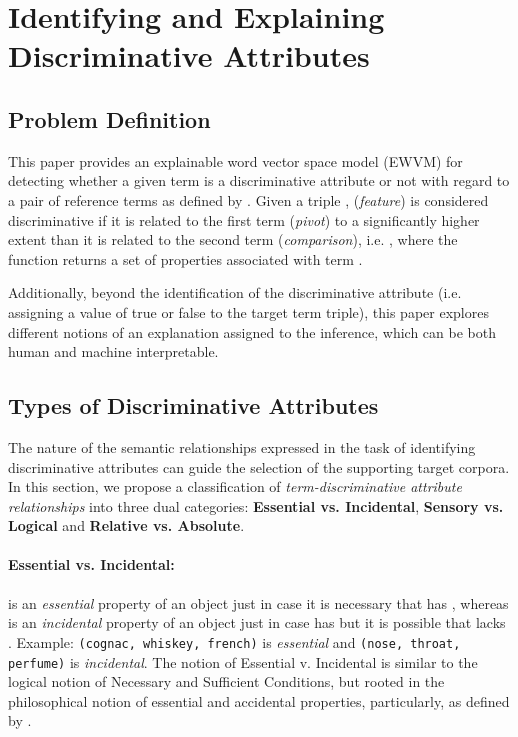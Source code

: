 \documentclass[11pt,a4paper]{article}
\begin{document}
\section{Identifying and Explaining Discriminative Attributes}

\subsection{Problem Definition}

This paper provides an explainable word vector space model (EWVM) for detecting whether a given term is a discriminative attribute or not with regard to a pair of reference terms as defined by \citet{semeval2018task10}. Given a triple ,   (\emph{feature}) is considered discriminative if it is related to the first term  (\emph{pivot}) to a significantly higher extent than it is related to the second term  (\emph{comparison}), i.e. \mbox{}, where the function  returns a set of properties associated with term . 

Additionally, beyond the identification of the discriminative attribute (i.e. assigning a value of true or false to the target term triple), this paper explores different notions of an explanation  assigned to the inference, which can be both human and machine interpretable.

\subsection{Types of Discriminative Attributes}

The nature of the semantic relationships expressed in the task of identifying discriminative attributes can guide the selection of the supporting target corpora. In this section, we propose a classification of \textit{term-discriminative attribute relationships} into three dual categories: \textbf{Essential vs. Incidental}, \textbf{Sensory vs. Logical} and \textbf{Relative vs. Absolute}. 

\paragraph{Essential vs. Incidental:}  is an \emph{essential} property of an object  just in case it is necessary that  has , whereas  is an \emph{incidental} property of an object  just in case  has  but it is possible that  lacks . Example: \texttt{(cognac, whiskey, french)} is \emph{essential} and \texttt{(nose, throat, perfume)} is \emph{incidental}. The notion of Essential v. Incidental is similar to the logical notion of Necessary and Sufficient Conditions, but rooted in the philosophical notion of essential and accidental properties, particularly, as defined by \citet{robertson:1}.
\end{document}
